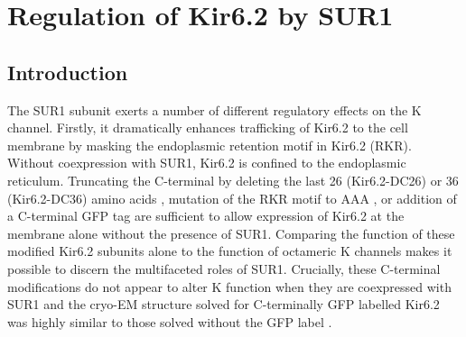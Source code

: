\chapter{\label{ch:6}Regulation of Kir6.2 by SUR1} 

\graphicspath{{figures/ch6/}}

\minitoc

\section{Introduction}
The SUR1 subunit exerts a number of different regulatory effects on the K\ATP{} channel.
Firstly, it dramatically enhances trafficking of Kir6.2 to the cell membrane by masking the endoplasmic retention motif in Kir6.2 (RKR).
Without coexpression with SUR1, Kir6.2 is confined to the endoplasmic reticulum.
Truncating the C-terminal by deleting the last 26 (Kir6.2-\textgreek{D}C26) or 36 (Kir6.2-\textgreek{D}C36) amino acids \cite{tucker_truncation_1997}, mutation of the RKR motif to AAA \cite{zerangue_new_1999}, or addition of a C-terminal GFP tag \cite{john_sulphonylurea_1998} are sufficient to allow expression of Kir6.2 at the membrane alone without the presence of SUR1.
Comparing the function of these modified Kir6.2 subunits alone to the function of octameric K\ATP{} channels makes it possible to discern the multifaceted roles of SUR1.
Crucially, these C-terminal modifications do not appear to alter K\ATP{} function when they are coexpressed with SUR1 \cite{tucker_truncation_1997, john_sulphonylurea_1998, ribalet_atp-sensitive_2006} and the cryo-EM structure solved for C-terminally GFP labelled Kir6.2 \cite{li_structure_2017} was highly similar to those solved without the GFP label \cite{martin_anti-diabetic_2017-1, lee_molecular_2017-1}.


